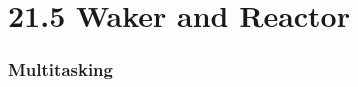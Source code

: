 \section{21.5 Waker and Reactor} %
\begin{frame}[fragile]
    \frametitle{Multitasking}
% 
% 
% 
% 
% 
% 
\end{frame}
